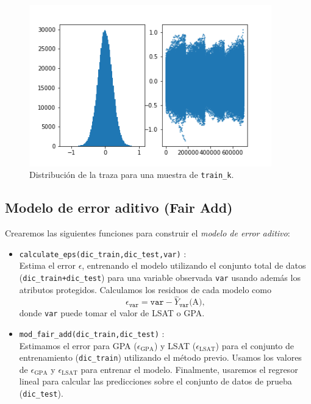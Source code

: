 \documentclass[oneside,openright,titlepage,numbers=noenddot,openany,headinclude,footinclude=true,
cleardoublepage=empty,abstractoff,BCOR=5mm,paper=a4,fontsize=12pt,main=spanish]{scrreprt}
\begin{document}
\begin{figure}[h]
	\centering
	\includegraphics[width=10.5cm]{muestrak.png}
	\caption{Distribución de la traza para una muestra de \texttt{train\_k}.}
    \label{fig:muestrak}
\end{figure}

\subsection*{Modelo de error aditivo (Fair Add)}

Crearemos las siguientes funciones para construir el \textit{modelo de error aditivo}:

\begin{itemize}
    \item \texttt{calculate\_eps(dic\_train,dic\_test,var)} :\\ 
    Estima el error $\epsilon$, entrenando el modelo utilizando el conjunto total de datos (\texttt{dic\_train+dic\_test}) para una variable observada \texttt{var} usando además los atributos protegidos. Calculamos los residuos de cada modelo como $$\epsilon_{\texttt{var}} = \texttt{var} - \hat{Y}_\texttt{var}\text{(A)},$$ donde \texttt{var} puede tomar el valor de LSAT o GPA.\\
    \item \texttt{mod\_fair\_add(dic\_train,dic\_test)} :\\
    Estimamos el error para GPA ($\epsilon_\text{GPA}$) y LSAT ($\epsilon_\text{LSAT}$) para el conjunto de entrenamiento (\texttt{dic\_train}) utilizando el método previo. Usamos los valores de $\epsilon_\text{GPA}$ y $\epsilon_\text{LSAT}$ para entrenar el modelo. Finalmente, usaremos el regresor lineal para calcular las predicciones sobre el conjunto de datos de prueba (\texttt{dic\_test}). 
\end{itemize}
\end{document}
